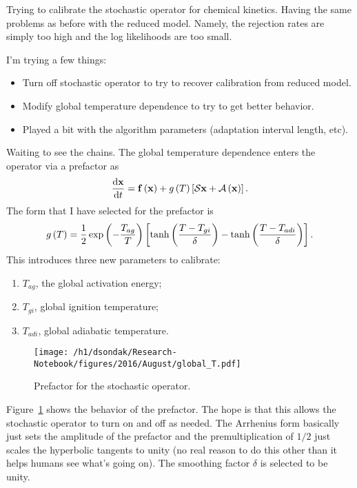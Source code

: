 
Trying to calibrate the stochastic operator for chemical kinetics.
Having the same problems as before with the reduced model.  Namely,
the rejection rates are simply too high and the log likelihoods are
too small.

I'm trying a few things:
\begin{itemize}
  \item Turn off stochastic operator to try to recover calibration from
        reduced model.
  \item Modify global temperature dependence to try to get better
        behavior.
  \item Played a bit with the algorithm parameters (adaptation interval
        length, etc).
\end{itemize}

Waiting to see the chains.  The global temperature dependence enters the
operator via a prefactor as
\begin{align}
  \frac{\mathrm{d} \mathbf{x}}{\mathrm{d} t} = \mathbf{f}\left(\mathbf{x}\right) + 
      g\left(T\right)\left[\mathcal{S}\mathbf{x} + \mathcal{A}\left(\mathbf{x}\right)\right].
\end{align}
The form that I have selected for the prefactor is
\begin{align}
  g\left(T\right) = \frac{1}{2}\exp\left(-\frac{T_{ag}}{T}\right)
    \left[\tanh\left(\frac{T - T_{gi}}{\delta}\right) - \tanh\left(\frac{T - T_{adi}}{\delta}\right)\right].
\end{align}
This introduces three new parameters to calibrate:
\begin{enumerate}
  \item $T_{ag}$, the global activation energy;
  \item $T_{gi}$, global ignition temperature;
  \item $T_{adi}$, global adiabatic temperature.
\end{enumerate}
\begin{figure}[ht!]
  \texttt{[image: /h1/dsondak/Research-Notebook/figures/2016/August/global\_T.pdf]}
  \caption{Prefactor for the stochastic operator.}
  \label{fig:gofT}
\end{figure}
Figure~\ref{fig:gofT} shows the behavior of the prefactor.  The hope is that this
allows the stochastic operator to turn on and off as needed.  The Arrhenius form
basically just sets the amplitude of the prefactor and the premultiplication of 
$1/2$ just scales the hyperbolic tangents to unity (no real reason to do this
other than it helps humans see what's going on).  The smoothing factor
$\delta$ is selected to be unity.
